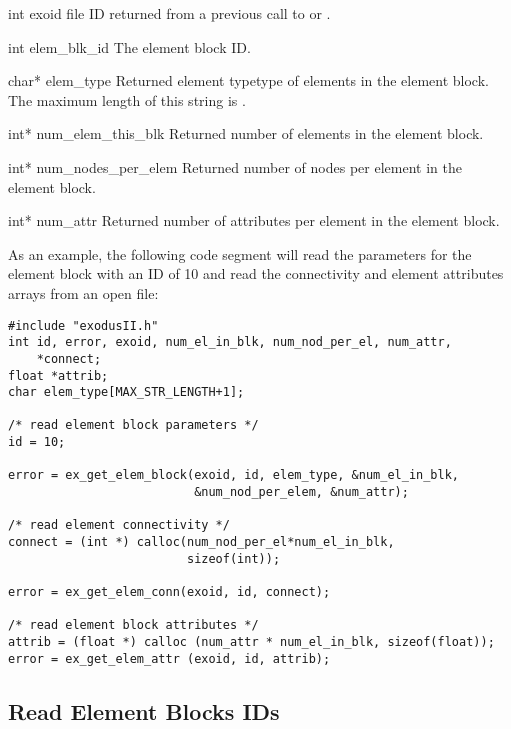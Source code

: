 
\begin{parameters}
\item[{int exoid \R{}}]
\exo{} file ID returned from a previous call to  or
.

\item[{int elem_blk_id \R{}}]
The element block ID.

\item[{char* elem_type \W{}}]
Returned element typetype of elements in the element block. 
The maximum length of this string is .

\item[{int* num_elem_this_blk \W{}}]
Returned number of elements in the element block.

\item[{int* num_nodes_per_elem \W{}}]
Returned number of nodes per element in the element block.

\item[{int* num_attr \W{}}]
Returned number of attributes per element in the element block.
\end{parameters}


As an example, the following code segment will read the parameters for
the element block with an ID of 10 and read the connectivity and
element attributes arrays from an open \exo{} file:
\begin{lstlisting}
#include "exodusII.h"
int id, error, exoid, num_el_in_blk, num_nod_per_el, num_attr, 
    *connect;
float *attrib;
char elem_type[MAX_STR_LENGTH+1];

/* read element block parameters */
id = 10;

error = ex_get_elem_block(exoid, id, elem_type, &num_el_in_blk, 
                          &num_nod_per_elem, &num_attr);

/* read element connectivity */
connect = (int *) calloc(num_nod_per_el*num_el_in_blk, 
                         sizeof(int));

error = ex_get_elem_conn(exoid, id, connect);

/* read element block attributes */
attrib = (float *) calloc (num_attr * num_el_in_blk, sizeof(float));
error = ex_get_elem_attr (exoid, id, attrib);
\end{lstlisting}

\subsection{Read Element Blocks IDs}

